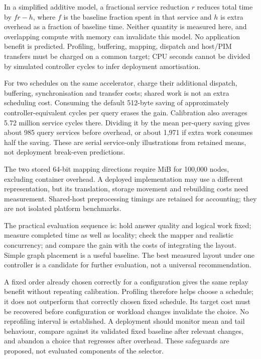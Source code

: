 \documentclass[conference]{IEEEtran}
\begin{document}
In a simplified additive model, a fractional service reduction $r$ reduces total time by $fr-h$, where $f$ is the baseline fraction spent in that service and $h$ is extra overhead as a fraction of baseline time. Neither quantity is measured here, and overlapping compute with memory can invalidate this model. No application benefit is predicted. Profiling, buffering, mapping, dispatch and host/PIM transfers must be charged on a common target; CPU seconds cannot be divided by simulated controller cycles to infer deployment amortisation.

For two schedules on the same accelerator, charge their additional dispatch, buffering, synchronisation and transfer costs; shared work is not an extra scheduling cost. Consuming the default 512-byte saving of approximately \RoundRobinBFSSavedFloat{} controller-equivalent cycles per query erases the gain. Calibration also averages 5.72 million service cycles there. Dividing it by the mean per-query saving gives about 985 query services before overhead, or about 1,971 if extra work consumes half the saving. These are serial service-only illustrations from retained means, not deployment break-even predictions.

The two stored 64-bit mapping directions require \MappingMiB{} MiB for 100,000 nodes, excluding container overhead. A deployed implementation may use a different representation, but its translation, storage movement and rebuilding costs need measurement. Shared-host preprocessing timings are retained for accounting; they are not isolated platform benchmarks.

The practical evaluation sequence is: hold answer quality and logical work fixed; measure completed time as well as locality; check the mapper and realistic concurrency; and compare the gain with the costs of integrating the layout. Simple graph placement is a useful baseline. The best measured layout under one controller is a candidate for further evaluation, not a universal recommendation.

A fixed order already chosen correctly for a configuration gives the same replay benefit without repeating calibration. Profiling therefore helps choose a schedule; it does not outperform that correctly chosen fixed schedule. Its target cost must be recovered before configuration or workload changes invalidate the choice. No reprofiling interval is established. A deployment should monitor mean and tail behaviour, compare against its validated fixed baseline after relevant changes, and abandon a choice that regresses after overhead. These safeguards are proposed, not evaluated components of the selector.
\end{document}
